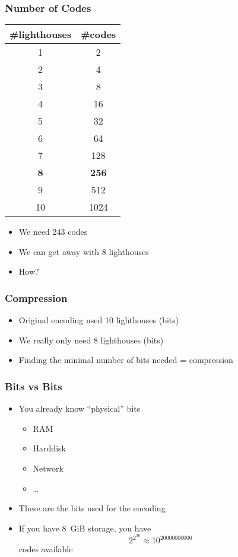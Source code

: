 \documentclass{../ucll-slides}
\begin{document}
\begin{frame}
  \frametitle{Number of Codes}
  \begin{center}
    \begin{tabular}{cc}
      \textbf{\#lighthouses} & \textbf{\#codes} \\
      \toprule
      1 & 2 \\
      2 & 4 \\
      3 & 8 \\
      4 & 16 \\
      5 & 32 \\
      6 & 64 \\
      7 & 128 \\
      \bf 8 & \bf 256 \\
      9 & 512 \\
      10 & 1024 \\
      \bottomrule
    \end{tabular}
  \end{center}
  \begin{itemize}
    \item We need 243 codes
    \item We can get away with 8 lighthouses
    \item How? \cake
  \end{itemize}
\end{frame}

\begin{frame}
  \frametitle{Compression}
  \begin{itemize}
    \item Original encoding used 10 lighthouses (bits)
    \item We really only need 8 lighthouses (bits)
    \item Finding the minimal number of bits needed = compression
  \end{itemize}
\end{frame}

\begin{frame}
  \frametitle{Bits vs Bits}
  \begin{itemize}
    \item You already know ``physical'' bits
          \begin{itemize}
            \item RAM
            \item Harddisk
            \item Network
            \item \dots
          \end{itemize}
    \item These are the bits used for the encoding
    \item If you have \SI{8}{GiB} storage, you have
          \[ 2^{2^{36}} \approx 10^{\SI{20000000000}{}} \]
          codes available
  \end{itemize}
\end{frame}
\end{document}
